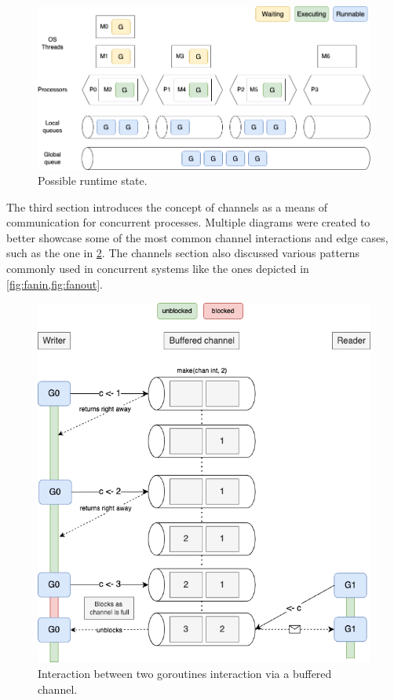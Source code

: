 \documentclass[
  digital,
  color,
  oneside,
  nosansbold,
  nocolorbold,
  nolof,
  nolot,
]{fithesis4}
\begin{document}
\begin{figure}[H]
    \centering
    \includegraphics[width=12cm]{figures/scheduling.png}
    \caption{Possible runtime state.}
    \label{fig:runtime}
\end{figure}

The third section introduces the concept of channels as a means of communication for concurrent processes. Multiple diagrams were created to better showcase some of the most common channel interactions and edge cases, such as the one in \cref{fig:goroutine-interactions}. The channels section also discussed various patterns commonly used in concurrent systems like the ones depicted in \cref{fig:fanin,fig:fanout}.

\begin{figure}[H]
    \centering
    \includegraphics[width=12cm]{figures/buffered-full.png}
    \caption{Interaction between two goroutines interaction via a buffered channel.}
    \label{fig:goroutine-interactions}
\end{figure}
\end{document}
